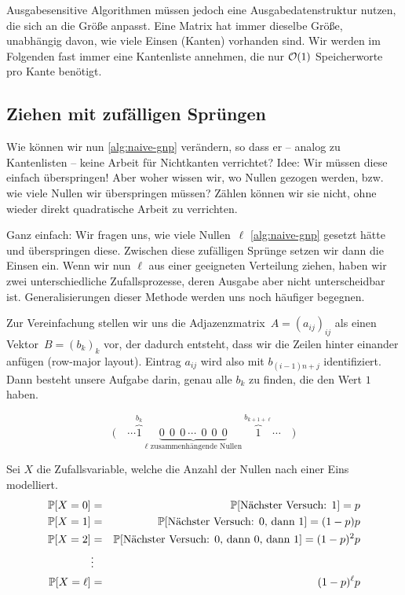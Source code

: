 Ausgabesensitive  Algorithmen müssen jedoch eine Ausgabedatenstruktur nutzen, die sich an die Größe anpasst.
Eine Matrix hat immer dieselbe Größe, unabhängig davon, wie viele Einsen (Kanten) vorhanden sind.
Wir werden im Folgenden fast immer eine Kantenliste annehmen, die nur $\mathcal{O}\!\left(1\right)$ Speicherworte pro Kante benötigt.

\subsection{Ziehen mit zufälligen Sprüngen}\label{subsec:gnp_zufaellige_spruenge}
Wie können wir nun \cref{alg:naive-gnp} verändern, so dass er -- analog zu Kantenlisten -- keine Arbeit für Nichtkanten verrichtet?
Idee: Wir müssen diese einfach überspringen!
Aber woher wissen wir, wo \glqq Nullen\grqq{} gezogen werden, bzw. wie viele Nullen wir überspringen müssen?
Zählen können wir sie nicht, ohne wieder direkt quadratische Arbeit zu verrichten.

Ganz  einfach: Wir fragen uns, wie viele Nullen~$\ell$ \cref{alg:naive-gnp} gesetzt hätte und überspringen diese.
Zwischen diese zufälligen Sprünge setzen wir dann die Einsen ein.
Wenn wir nun $\ell$ aus einer geeigneten Verteilung ziehen, haben wir zwei unterschiedliche Zufallsprozesse, deren Ausgabe aber nicht unterscheidbar ist.
Generalisierungen dieser Methode werden uns noch häufiger begegnen.

Zur  Vereinfachung stellen wir uns die Adjazenzmatrix~$A = (a_{ij})_{ij}$ als einen Vektor~$B = (b_k)_k$ vor, der dadurch entsteht, dass wir die Zeilen hinter einander anfügen (row-major layout).
Eintrag $a_{ij}$ wird also mit $b_{(i-1)n + j}$ identifiziert.
Dann besteht unsere Aufgabe darin, genau alle $b_k$ zu finden, die den Wert $1$ haben.

\begin{equation}
    \Big(\quad \cdots \overbrace{1}^{b_k} \ \underbrace{0 \ \ 0\ \ 0 \ \cdots\ \ 0\ \ 0\ \ 0}_{\text{$\ell$ zusammenhängende Nullen}}\  \overbrace{1}^{b_{k + 1+ \ell}} \cdots \quad \Big)
\end{equation}

\noindent
Sei $X$ die  Zufallsvariable, welche die Anzahl der Nullen nach einer Eins modelliert.
\begin{eqnarray}
    \mathbb{P}\!\left[X = 0\right] &=& \mathbb{P}\!\left[\textnormal{Nächster Versuch: 1}\right] = p \\
    \mathbb{P}\!\left[X = 1\right] &=& \mathbb{P}\!\left[\textnormal{Nächster Versuch: 0, dann 1}\right] = (1 - p)p \\
    \mathbb{P}\!\left[X = 2\right] &=& \mathbb{P}\!\left[\textnormal{Nächster Versuch: 0, dann 0, dann 1}\right] = (1 - p)^2 p \\
    &\vdots& \\
    \mathbb{P}\!\left[X = \ell\right] &=& (1 - p)^\ell p
\end{eqnarray}

